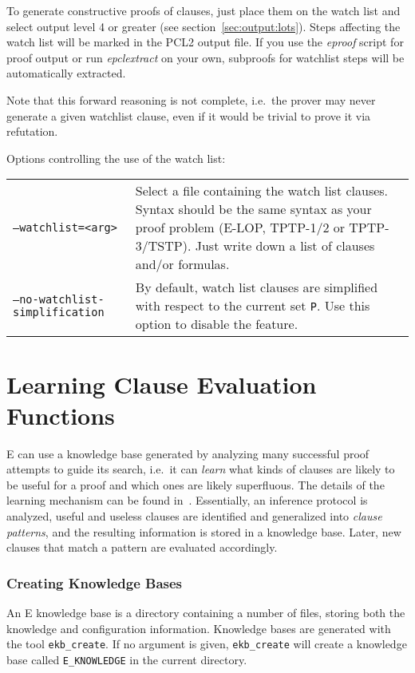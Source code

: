 \documentclass{report}
\begin{document}
To generate constructive proofs of clauses, just place them on the
watch list and select output level 4 or greater (see
section~\ref{sec:output:lots}). Steps affecting the watch list will be
marked in the PCL2 output file. If you use the \emph{eproof} script
for proof output or run \emph{epclextract} on your own, subproofs for
watchlist steps will be automatically extracted.

Note that this forward reasoning is not complete, i.e.\ the prover may
never generate a given watchlist clause, even if it would be trivial
to prove it via refutation.

Options controlling the use of the watch list:\\
\begin{tabular}{lp{5.8cm}}
  \texttt{--watchlist=<arg>} & Select a file containing the watch list
  clauses. Syntax should be the same syntax as your proof problem
  (E-LOP\index{LOP}, TPTP-1/2 or
  TPTP-3/TSTP\index{TPTP!language}). Just write down a list of
  clauses and/or formulas.\\
  \texttt{--no-watchlist-simplification} & By default, watch list
  clauses are simplified with respect to the current set
  \texttt{P}. Use this option to disable the feature.
\end{tabular}


\section{Learning Clause Evaluation Functions}
\label{sec:options:learning}

E can use a knowledge base generated by analyzing many successful
proof attempts to guide its search, i.e.\ it can \emph{learn} what
kinds of clauses are likely to be useful for a proof and which ones
are likely superfluous. The details of the learning mechanism can be
found in~\cite{Schulz:Diss-2000,Schulz:KI-2001}. Essentially, an
inference protocol is analyzed, useful and useless clauses are
identified and generalized into \emph{clause patterns}, and the
resulting information is stored in a knowledge base. Later, new clauses
that match a pattern are evaluated accordingly.

\subsubsection{Creating Knowledge Bases}

An E knowledge base is a directory containing a number of files,
storing both the knowledge and configuration information. Knowledge
bases are generated with the tool \texttt{ekb\_create}. If no argument
is given, \texttt{ekb\_create} will create a knowledge base called
\texttt{E\_KNOWLEDGE} in the current directory.
\end{document}
